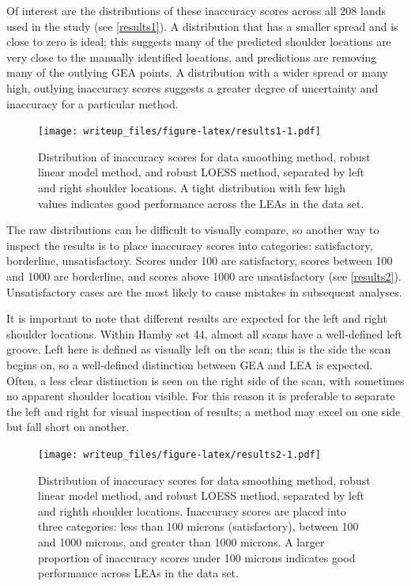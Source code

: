 \documentclass[]{article}
\begin{document}
{\color{orange}{XXX}}

Of interest are the distributions of these inaccuracy scores across all
208 lands used in the study (see \autoref{results1}). A distribution
that has a smaller spread and is close to zero is ideal; this suggests
many of the predicted shoulder locations are very close to the manually
identified locations, and predictions are removing many of the outlying
GEA points. A distribution with a wider spread or many high, outlying
inaccuracy scores suggests a greater degree of uncertainty and
inaccuracy for a particular method.

\begin{figure}
\centering
\texttt{[image: writeup\_files/figure-latex/results1-1.pdf]}
\caption{\label{results1}Distribution of inaccuracy scores for data
smoothing method, robust linear model method, and robust LOESS method,
separated by left and right shoulder locations. A tight distribution
with few high values indicates good performance across the LEAs in the
data set.}
\end{figure}

The raw distributions can be difficult to visually compare, so another
way to inspect the results is to place inaccuracy scores into
categories: satisfactory, borderline, unsatisfactory. Scores under 100
are satisfactory, scores between 100 and 1000 are borderline, and scores
above 1000 are unsatisfactory (see \autoref{results2}). Unsatisfactory
cases are the most likely to cause mistakes in subsequent analyses.

It is important to note that different results are expected for the left
and right shoulder locations. Within Hamby set 44, almost all scans have
a well-defined left groove. Left here is defined as visually left on the
scan; this is the side the scan begins on, so a well-defined distinction
between GEA and LEA is expected. Often, a less clear distinction is seen
on the right side of the scan, with sometimes no apparent shoulder
location visible. For this reason it is preferable to separate the left
and right for visual inspection of results; a method may excel on one
side but fall short on another.

\begin{figure}
\centering
\texttt{[image: writeup\_files/figure-latex/results2-1.pdf]}
\caption{\label{results2}Distribution of inaccuracy scores for data
smoothing method, robust linear model method, and robust LOESS method,
separated by left and righth shoulder locations. Inaccuracy scores are
placed into three categories: less than 100 microns (satisfactory),
between 100 and 1000 microns, and greater than 1000 microns. A larger
proportion of inaccuracy scores under 100 microns indicates good
performance across LEAs in the data set.}
\end{figure}
\end{document}
